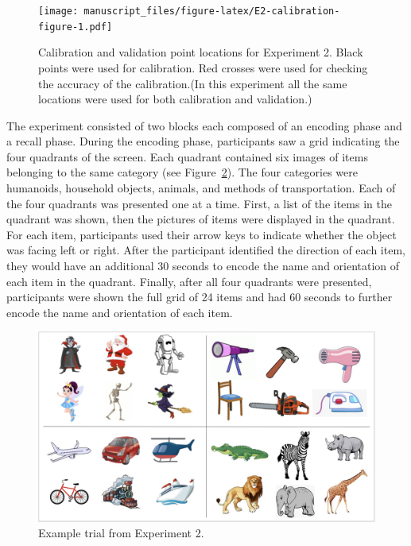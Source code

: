 \documentclass[
  man,floatsintext]{apa6}
\begin{document}
\begin{figure}
\centering
\texttt{[image: manuscript\_files/figure-latex/E2-calibration-figure-1.pdf]}
\caption{\label{fig:E2-calibration-figure}Calibration and validation point locations for Experiment 2. Black points were used for calibration. Red crosses were used for checking the accuracy of the calibration.(In this experiment all the same locations were used for both calibration and validation.)}
\end{figure}

The experiment consisted of two blocks each composed of an encoding
phase and a recall phase. During the encoding phase, participants saw a
grid indicating the four quadrants of the screen. Each quadrant
contained six images of items belonging to the same category (see Figure~\ref{fig:E2-example-trial}).
The four categories were humanoids, household objects, animals, and
methods of transportation.
Each of the four quadrants was presented one at a time. First, a list of
the items in the quadrant was shown, then the pictures of items were displayed in the quadrant.
For each item, participants used their arrow keys to indicate whether the object was facing left or right. After the participant identified the direction of each
item, they would have an additional 30 seconds to encode the name and
orientation of each item in the quadrant. Finally, after all four quadrants
were presented, participants were shown the full grid of
24 items and had 60 seconds to further encode the name and orientation
of each item.

\begin{figure}
\centering
\includegraphics{group-b/E2-example-figure.jpeg}
\caption{\label{fig:E2-example-trial}Example trial from Experiment 2.}
\end{figure}
\end{document}
